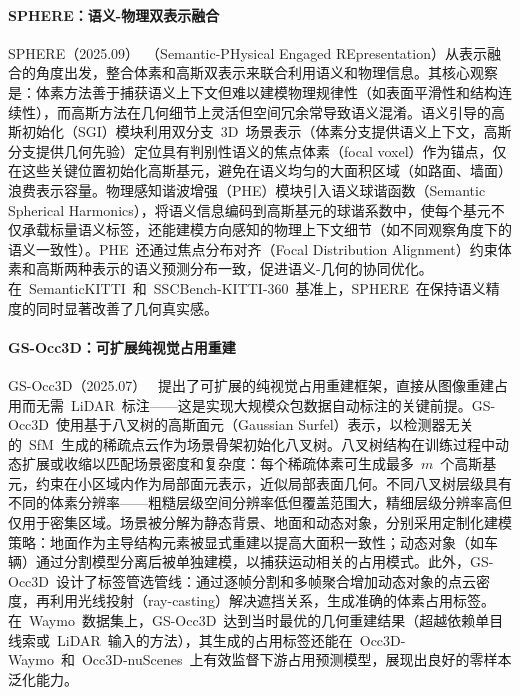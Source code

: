 \paragraph{SPHERE：语义-物理双表示融合} SPHERE（2025.09）~\cite{2509_11171}（Semantic-PHysical Engaged REpresentation）从表示融合的角度出发，整合体素和高斯双表示来联合利用语义和物理信息。其核心观察是：体素方法善于捕获语义上下文但难以建模物理规律性（如表面平滑性和结构连续性），而高斯方法在几何细节上灵活但空间冗余常导致语义混淆。语义引导的高斯初始化（SGI）模块利用双分支~3D~场景表示（体素分支提供语义上下文，高斯分支提供几何先验）定位具有判别性语义的焦点体素（focal voxel）作为锚点，仅在这些关键位置初始化高斯基元，避免在语义均匀的大面积区域（如路面、墙面）浪费表示容量。物理感知谐波增强（PHE）模块引入语义球谐函数（Semantic Spherical Harmonics），将语义信息编码到高斯基元的球谐系数中，使每个基元不仅承载标量语义标签，还能建模方向感知的物理上下文细节（如不同观察角度下的语义一致性）。PHE~还通过焦点分布对齐（Focal Distribution Alignment）约束体素和高斯两种表示的语义预测分布一致，促进语义-几何的协同优化。在~SemanticKITTI~和~SSCBench-KITTI-360~基准上，SPHERE~在保持语义精度的同时显著改善了几何真实感。

\paragraph{GS-Occ3D：可扩展纯视觉占用重建}

GS-Occ3D（2025.07）~\cite{2507_19451} 提出了可扩展的纯视觉占用重建框架，直接从图像重建占用而无需~LiDAR~标注——这是实现大规模众包数据自动标注的关键前提。GS-Occ3D~使用基于八叉树的高斯面元（Gaussian Surfel）表示，以检测器无关的~SfM~生成的稀疏点云作为场景骨架初始化八叉树。八叉树结构在训练过程中动态扩展或收缩以匹配场景密度和复杂度：每个稀疏体素可生成最多~$m$~个高斯基元，约束在小区域内作为局部面元表示，近似局部表面几何。不同八叉树层级具有不同的体素分辨率——粗糙层级空间分辨率低但覆盖范围大，精细层级分辨率高但仅用于密集区域。场景被分解为静态背景、地面和动态对象，分别采用定制化建模策略：地面作为主导结构元素被显式重建以提高大面积一致性；动态对象（如车辆）通过分割模型分离后被单独建模，以捕获运动相关的占用模式。此外，GS-Occ3D~设计了标签管选管线：通过逐帧分割和多帧聚合增加动态对象的点云密度，再利用光线投射（ray-casting）解决遮挡关系，生成准确的体素占用标签。在~Waymo~数据集上，GS-Occ3D~达到当时最优的几何重建结果（超越依赖单目线索或~LiDAR~输入的方法），其生成的占用标签还能在~Occ3D-Waymo~和~Occ3D-nuScenes~上有效监督下游占用预测模型，展现出良好的零样本泛化能力。

